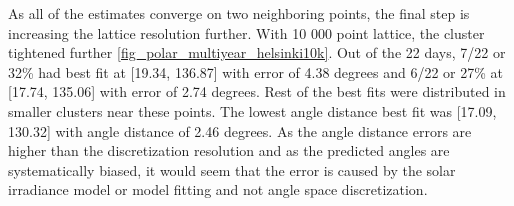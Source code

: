 As all of the estimates converge on two neighboring points, the final step is increasing the lattice resolution further. With 10 000 point lattice, the cluster tightened further \ref{fig_polar_multiyear_helsinki10k}. Out of the 22 days, 7/22 or 32\% had best fit at [19.34, 136.87] with error of 4.38 degrees and 6/22 or 27\% at [17.74, 135.06] with error of 2.74 degrees. Rest of the best fits were distributed in smaller clusters near these points. The lowest angle distance best fit was [17.09, 130.32] with angle distance of 2.46 degrees. As the angle distance errors are higher than the discretization resolution and as the predicted angles are systematically biased, it would seem that the error is caused by the solar irradiance model or model fitting and not angle space discretization.





